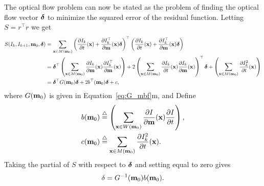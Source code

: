 The optical flow problem can now be stated as the problem of finding the optical flow vector $\boldsymbol{\delta}$ to minimize the squared error of the residual function.  
Letting $S = r^\top r$ we get 
\begin{align*}
S(I_k, I_{k+1}, \mathbf{m}_0, \boldsymbol{\delta}) &= \sum_{\mathbf{x}\in M(\mathbf{m}_0)} \left(\frac{\partial I_k}{\partial t}(\mathbf{x}) + \frac{\partial I_k^\top}{\partial \mathbf{m}}(\mathbf{x})\boldsymbol{\delta}\right)^\top \left(\frac{\partial I_k}{\partial t}(\mathbf{x}) + \frac{\partial I_k^\top}{\partial \mathbf{m}}(\mathbf{x})\boldsymbol{\delta}\right) \\
&= \boldsymbol{\delta}^\top \left(\sum_{\mathbf{x}\in M(\mathbf{m}_0)}\frac{\partial I_k}{\partial \mathbf{m}}(\mathbf{x})\frac{\partial I_k^\top}{\partial \mathbf{m}}(\mathbf{x})\right) 
	+ 2\left(\sum_{\mathbf{x}\in M(\mathbf{m}_0)}\frac{\partial I_k}{\partial t}(\mathbf{x})\frac{\partial I_k}{\partial \mathbf{m}}(\mathbf{x})\right)^\top \boldsymbol{\delta} 
	+ \left(\sum_{\mathbf{x}\in M(\mathbf{m}_0)}\frac{\partial I_k^2}{\partial t}(\mathbf{x}) \right) \\
&= 	\boldsymbol{\delta}^\top G(\mathbf{m}_0) \boldsymbol{\delta} + 2b^\top(\mathbf{m}_0) \boldsymbol{\delta} + c,
\end{align*}
where $G(\mathbf{m}_0)$ is given in Equation~\eqref{eq:G_mbf}m, and 
Define 
\begin{align*}
b(\mathbf{m}_0) &\stackrel{\triangle}{=} \left(\sum_{\mathbf{x}\in W(\mathbf{m}_0)} \frac{\partial I}{\partial\mathbf{m}}(\mathbf{x}) \frac{\partial I}{\partial t}\right), \\
c(\mathbf{m}_0) &\stackrel{\triangle}{=} \sum_{\mathbf{x}\in M(\mathbf{m}_0)}\frac{\partial I_k^2}{\partial t}(\mathbf{x}).
\end{align*}
Taking the partial of $S$ with respect to $\boldsymbol{\delta}$ and setting equal to zero gives
\[
\delta = G^{-1}(\mathbf{m}_0) b(\mathbf{m}_0).
\] 
%
%
%
%

